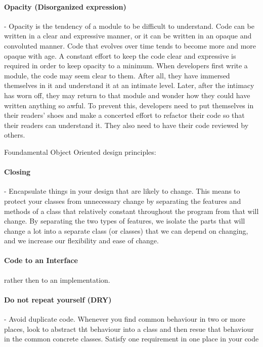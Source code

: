 \documentclass{llncs}
\begin{document}
\paragraph{Opacity (Disorganized expression)} - Opacity is the tendency of a module to be difficult to understand. 
Code can be written in a clear and expressive manner, or it can be written in an opaque and convoluted manner.
Code that evolves over time tends to become more and more opaque with age. 
A constant effort to keep the code clear and expressive is required in order to keep opacity to a minimum.
When developers first write a module, the code may seem clear to them.
After all, they have immersed themselves in it and understand it at an intimate level.
Later, after the intimacy has worn off, they may return to that module and wonder how they could have written anything so awful. 
To prevent this, developers need to put themselves in their readers' shoes and make a concerted effort to refactor their code so that their readers can understand it.
They also need to have their code reviewed by others.

Foundamental Object Oriented design principles:\\

\paragraph{Closing} - Encapsulate things in your design that are likely to change. This means to protect your classes from unnecessary change by separating the features and methods of a class that relatively constant throughout the program from that will change. By separating the two types of features, we isolate the parts that will change a lot into a separate class (or classes) that we can depend on changing, and we increase our flexibility and ease of change. \cite{Dooley}

\paragraph{Code to an Interface} rather then to an implementation. \cite{Dooley}

\paragraph{Do not repeat yourself (DRY)} - Avoid duplicate code. Whenever you find common behaviour in two or more places, look to abstract tht behaviour into a class and then resue that behaviour in the common concrete classes. Satisfy one requirement in one place in your code\cite{Dooley}
\end{document}
